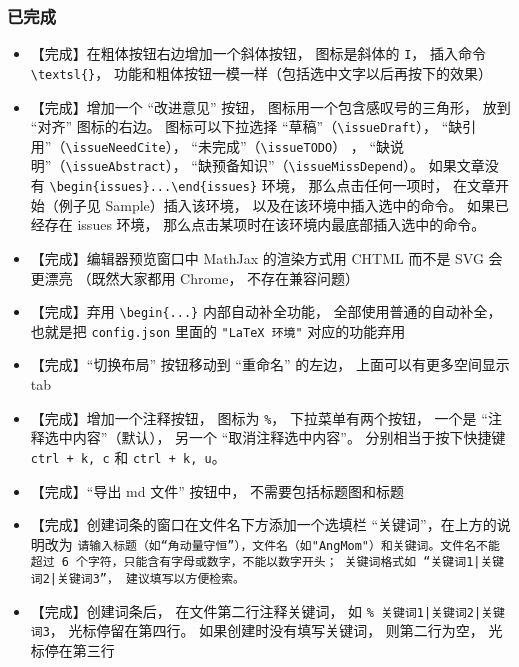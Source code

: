 \subsubsection{已完成}
\begin{itemize}
\item 【完成】在粗体按钮右边增加一个斜体按钮， 图标是斜体的 \verb|I|， 插入命令 \verb|\textsl{}|， 功能和粗体按钮一模一样（包括选中文字以后再按下的效果）

\item 【完成】增加一个 “改进意见” 按钮， 图标用一个包含感叹号的三角形， 放到 “对齐” 图标的右边。 图标可以下拉选择 “草稿”（\verb|\issueDraft|）， “缺引用”（\verb|\issueNeedCite|）， “未完成”（\verb|\issueTODO|） ， “缺说明”（\verb|\issueAbstract|）， “缺预备知识”（\verb|\issueMissDepend|）。 如果文章没有 \verb|\begin{issues}...\end{issues}| 环境， 那么点击任何一项时， 在文章开始（例子见 Sample）插入该环境， 以及在该环境中插入选中的命令。 如果已经存在 issues 环境， 那么点击某项时在该环境内最底部插入选中的命令。

\item 【完成】编辑器预览窗口中 MathJax 的渲染方式用 CHTML 而不是 SVG 会更漂亮 （既然大家都用 Chrome， 不存在兼容问题）

\item 【完成】弃用 \verb|\begin{...}| 内部自动补全功能， 全部使用普通的自动补全， 也就是把 \verb|config.json| 里面的 \verb|"LaTeX 环境"| 对应的功能弃用

\item 【完成】“切换布局” 按钮移动到 “重命名” 的左边， 上面可以有更多空间显示 tab

\item 【完成】增加一个注释按钮， 图标为 \verb|%|， 下拉菜单有两个按钮， 一个是 “注释选中内容”（默认）， 另一个 “取消注释选中内容”。 分别相当于按下快捷键 \verb|ctrl + k, c| 和 \verb|ctrl + k, u|。

\item 【完成】“导出 md 文件” 按钮中， 不需要包括标题图和标题

\item 【完成】创建词条的窗口在文件名下方添加一个选填栏 “关键词”，在上方的说明改为 \lstinline+请输入标题（如“角动量守恒”），文件名（如"AngMom"）和关键词。文件名不能超过 6 个字符，只能含有字母或数字，不能以数字开头； 关键词格式如 “关键词1|关键词2|关键词3”， 建议填写以方便检索。+

\item 【完成】创建词条后， 在文件第二行注释关键词， 如 \lstinline+% 关键词1|关键词2|关键词3+， 光标停留在第四行。 如果创建时没有填写关键词， 则第二行为空， 光标停在第三行


\end{itemize}
